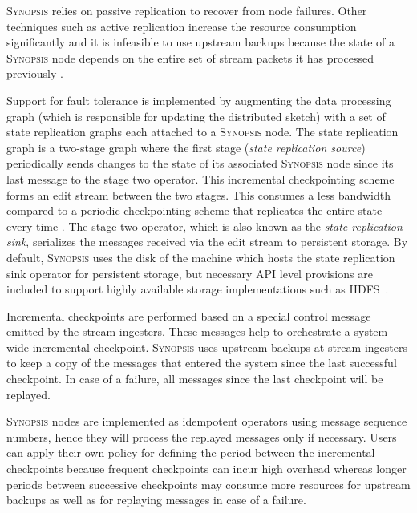 \textsc{Synopsis} relies on passive replication to recover from node failures.
Other techniques such as active replication increase the resource consumption significantly and it is infeasible to use upstream backups because the state of a \textsc{Synopsis} node depends on the entire set of stream packets it has processed previously \cite{castro2013integrating}.

Support for fault tolerance is implemented by augmenting the data processing graph (which is responsible for updating the distributed sketch) 	with a set of state replication graphs each attached to a \textsc{Synopsis} node.
The state replication graph is a two-stage graph where the first stage (\textit{state replication source}) periodically sends changes to the state of its associated \textsc{Synopsis} node since its last message to the stage two operator.
This incremental checkpointing scheme forms an edit stream between the two stages.
This consumes a less bandwidth compared to a periodic checkpointing scheme that replicates the entire state every time \cite{castro2013integrating}.
The stage two operator, which is also known as the \textit{state replication sink}, serializes the messages received via the edit stream to persistent storage.
By default, \textsc{Synopsis} uses the disk of the machine which hosts the state replication sink operator for persistent storage, but necessary API level provisions are included to support highly available storage implementations such as HDFS~\cite{borthakur2008hdfs}.

Incremental checkpoints are performed based on a special control message emitted by the stream ingesters.
These messages help to orchestrate a system-wide incremental checkpoint.
\textsc{Synopsis} uses upstream backups at stream ingesters to keep a copy of the messages that entered the system since the last successful checkpoint.
In case of a failure, all messages since the last checkpoint will be replayed.

\textsc{Synopsis} nodes are implemented as idempotent operators using message sequence numbers, hence they will process the replayed messages only if necessary.
Users can apply their own policy for defining the period between the incremental checkpoints because frequent checkpoints can incur high overhead whereas longer periods between successive checkpoints may consume more resources for upstream backups as well as for replaying messages in case of a failure.


